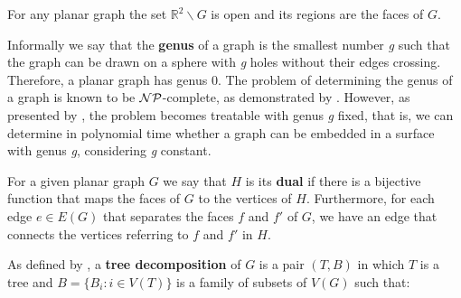 For any planar graph the set \(\mathbb{R}^2 \backslash G\) is open and its regions are the faces of \(G\).

Informally we say that the \textbf{genus} of a graph is the smallest number \textit{g} such that the graph can be drawn on a sphere with \textit{g} holes without their edges crossing. Therefore, a planar graph has genus 0. The problem of determining the genus of a graph is known to be \(\mathcal{NP}\)-complete, as demonstrated by \cite{THOMASSEN1989568}. However, as presented by \cite{LinearGenus}, the problem becomes treatable with genus \textit{g} fixed, that is, we can determine in polynomial time whether a graph can be embedded in a surface with genus \textit{g}, considering \textit{g} constant.



For a given planar graph \(G\) we say that \(H\) is its \textbf{dual} if there is a bijective function that maps the faces of \(G\) to the vertices of \(H\). Furthermore, for each edge \(e \in E(G)\) that separates the faces \(f\) and \(f'\) of \(G\), we have an edge that connects the vertices referring to \(f\) and \(f'\) in \(H\).


As defined by \cite{ROBERTSON1986309}, a \textbf{tree decomposition} of \(G\) is a pair \((T, B)\) in which \(T\) is a tree and \(B = \{B_i \colon i \in V(T)\}\) is a family of subsets of \(V(G)\) such that:

